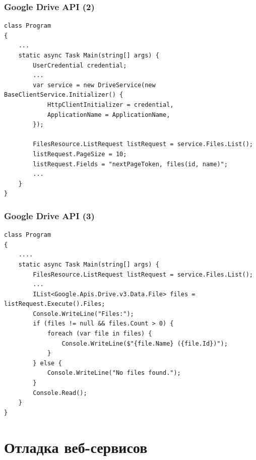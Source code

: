 \documentclass{../../slides-style}
\begin{document}
    \begin{frame}[fragile]
        \frametitle{Google Drive API (2)}
        \begin{scriptsize}
            \begin{verbatim}
class Program
{
    ...
    static async Task Main(string[] args) {
        UserCredential credential;
        ...
        var service = new DriveService(new BaseClientService.Initializer() {
            HttpClientInitializer = credential,
            ApplicationName = ApplicationName,
        });

        FilesResource.ListRequest listRequest = service.Files.List();
        listRequest.PageSize = 10;
        listRequest.Fields = "nextPageToken, files(id, name)";
        ...
    }
}
            \end{verbatim}
        \end{scriptsize}
    \end{frame}

    \begin{frame}[fragile]
        \frametitle{Google Drive API (3)}
        \begin{scriptsize}
            \begin{verbatim}
class Program
{
    ....
    static async Task Main(string[] args) {
        FilesResource.ListRequest listRequest = service.Files.List();
        ...
        IList<Google.Apis.Drive.v3.Data.File> files = listRequest.Execute().Files;
        Console.WriteLine("Files:");
        if (files != null && files.Count > 0) {
            foreach (var file in files) {
                Console.WriteLine($"{file.Name} ({file.Id})");
            }
        } else {
            Console.WriteLine("No files found.");
        }
        Console.Read();
    }
}
            \end{verbatim}
        \end{scriptsize}
    \end{frame}

    \section{Отладка веб-сервисов}
\end{document}
